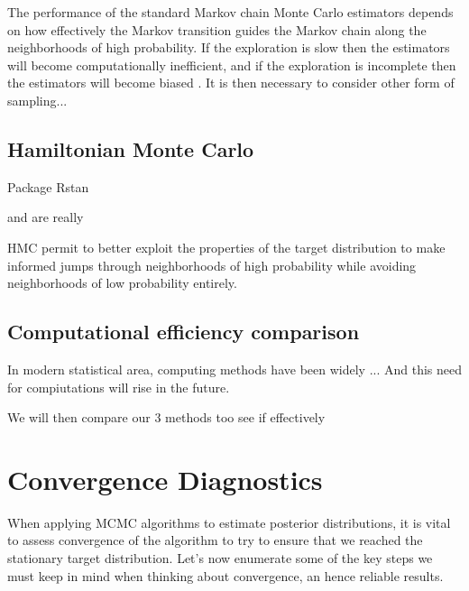 \documentclass[11pt,a4paper,openany ]{book}
\begin{document}
The  performance  of  the standard  Markov  chain  Monte  Carlo  estimators  depends  on  how  effectively the Markov transition guides the Markov chain along the neighborhoods of high probability.  If  the  exploration  is  slow  then  the  estimators  will  become  computationally inefficient,  and  if  the  exploration  is  incomplete  then  the  estimators  will  become  biased
\citet{betancourt_diagnosing_2016}. It is then necessary to consider other form of sampling...


\subsection{Hamiltonian Monte Carlo}

Package Rstan

\cite{neal_mcmc_2011} and \cite{betancourt_hamiltonian_2015} are really 


HMC permit to better exploit the properties of
the target distribution to make informed jumps through neighborhoods of high probability while avoiding neighborhoods of low probability entirely.


\subsection{Computational efficiency comparison}

In modern statistical area, computing methods have been widely ... 
And this need for compiutations will rise in the future. 

We will then compare our 3 methods too see if effectively


\section{Convergence Diagnostics}

When applying MCMC algorithms to estimate posterior distributions, it is vital to assess convergence of the algorithm to try to ensure that we reached the stationary target distribution. Let's now enumerate some of the key steps we must keep in mind when thinking about convergence, an hence reliable results.
\end{document}
